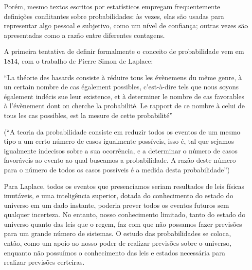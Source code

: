 Porém, mesmo textos escritos por estatísticos empregam frequentemente definições conflitantes sobre probabilidades: às vezes,
elas são usadas para representar algo pessoal e subjetivo, como um nível de confiança; outras vezes são apresentadas como a
razão entre diferentes contagens.

A primeira tentativa de definir formalmente o conceito de probabilidade vem em 1814,
com o trabalho de Pierre Simon de Laplace:

``La théorie des hasards consiste à réduire tous les évènemens du même genre, à un certain nombre de cas également
possibles, c'est-à-dire tels que nous soyons également indécis sue leur existence, et à determiner le nombre de cas
favorables à l'évènement dont on cherche la probabilité. Le rapport de ce nombre à celui de tous les cas possibles,
est la mesure de cette probabilité'' 
\citep{Laplace1814}

(``A teoria da probabilidade consiste em reduzir todos os eventos de um mesmo tipo a um certo número de casos igualmente
possíveis, isso é, tal que sejamos igualmente indecisos sobre a sua ocorrência, e a determinar o número de casos
favoráveis ao evento ao qual buscamos a probabilidade. A razão deste número para o número de todos os casos possíveis
é a medida desta probabilidade'')

Para Laplace, todos os eventos que presenciamos seriam resultados de leis físicas
imutáveis, e uma inteligência superior, dotada do conhecimento do estado do universo em um dado instante, poderia prever
todos os eventos futuros sem qualquer incerteza. No entanto, nosso conhecimento limitado, tanto do estado do universo
quanto das leis que o regem, faz com que não possamos fazer previsões para um grande número de sistemas. O estudo das 
probabilidades se coloca, então, como um apoio ao nosso poder de realizar previsões sobre o universo, 
enquanto não possuímos o conhecimento das leis e estados necessária para realizar previsões certeiras. 

